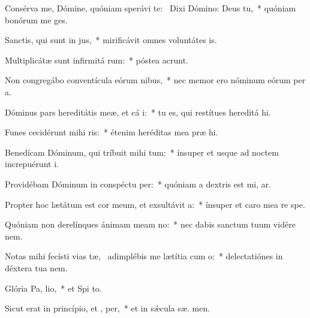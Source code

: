 \item Consérva me, Dómine, quóniam sperávi  te:~\pscross{} Dixi Dómino: Deus   tu,~* quóniam bonórum me  ges.
\item Sanctis, qui sunt in  jus,~* mirificávit omnes voluntátes   is.
\item Multiplicátæ sunt infirmitá rum:~* póstea acrunt.
\item Non congregábo conventícula eórum  nibus,~* nec memor ero nóminum eórum per  a.
\item Dóminus pars hereditátis meæ, et cá i:~* tu es, qui restítues hereditá  hi.
\item Funes cecidérunt mihi  ris:~* étenim heréditas mea præ  hi.
\item Benedícam Dóminum, qui tríbuit mihi tum:~* ínsuper et usque ad noctem increpuérunt   i.
\item Providébam Dóminum in conspéctu  per:~* quóniam a dextris est mi,  ar.
\item Propter hoc lætátum est cor meum, et exsultávit  a:~* ínsuper et caro mea re  spe.
\item Quóniam non derelínques ánimam meam  no:~* nec dabis sanctum tuum vidére nem.
\item Notas mihi fecísti vias tæ,~\pscross{} adimplébis me lætítia cum  o:~* delectatiónes in déxtera tua   nem.
\item Glória Pa,  lio,~* et Spi to.
\item Sicut erat in princípio, et ,  per,~* et in sǽcula sæ. men.
